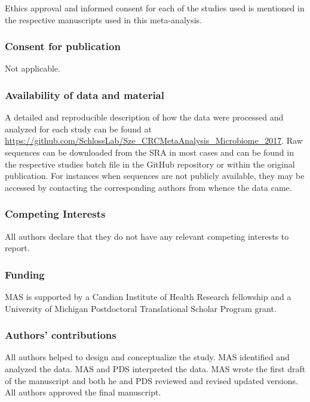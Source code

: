 \documentclass[12pt,]{article}
\begin{document}
Ethics approval and informed consent for each of the studies used is
mentioned in the respective manuscripts used in this meta-analysis.

\subsubsection{Consent for publication}\label{consent-for-publication}

Not applicable.

\subsubsection{Availability of data and
material}\label{availability-of-data-and-material}

A detailed and reproducible description of how the data were processed
and analyzed for each study can be found at
\url{https://github.com/SchlossLab/Sze_CRCMetaAnalysis_Microbiome_2017}.
Raw sequences can be downloaded from the SRA in most cases and can be
found in the respective studies batch file in the GitHub repository or
within the original publication. For instances when sequences are not
publicly available, they may be accessed by contacting the corresponding
authors from whence the data came.

\subsubsection{Competing Interests}\label{competing-interests}

All authors declare that they do not have any relevant competing
interests to report.

\subsubsection{Funding}\label{funding}

MAS is supported by a Candian Institute of Health Research fellowship
and a University of Michigan Postdoctoral Translational Scholar Program
grant.

\subsubsection{Authors' contributions}\label{authors-contributions}

All authors helped to design and conceptualize the study. MAS identified
and analyzed the data. MAS and PDS interpreted the data. MAS wrote the
first draft of the manuscript and both he and PDS reviewed and revised
updated versions. All authors approved the final manuscript.
\end{document}
